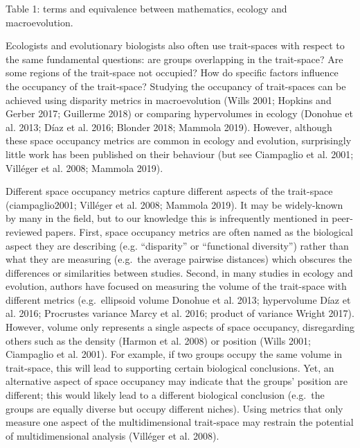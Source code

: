 \documentclass[]{article}
\begin{document}
Table 1: terms and equivalence between mathematics, ecology and
macroevolution.

\renewcommand\baselinestretch{2}\selectfont

Ecologists and evolutionary biologists also often use trait-spaces with
respect to the same fundamental questions: are groups overlapping in the
trait-space? Are some regions of the trait-space not occupied? How do
specific factors influence the occupancy of the trait-space? Studying
the occupancy of trait-spaces can be achieved using disparity metrics in
macroevolution (Wills 2001; Hopkins and Gerber 2017; Guillerme 2018) or
comparing hypervolumes in ecology (Donohue et al. 2013; Díaz et al.
2016; Blonder 2018; Mammola 2019). However, although these space
occupancy metrics are common in ecology and evolution, surprisingly
little work has been published on their behaviour (but see Ciampaglio et
al. 2001; Villéger et al. 2008; Mammola 2019).

Different space occupancy metrics capture different aspects of the
trait-space (ciampaglio2001; Villéger et al. 2008; Mammola 2019). It may
be widely-known by many in the field, but to our knowledge this is
infrequently mentioned in peer-reviewed papers. First, space occupancy
metrics are often named as the biological aspect they are describing
(e.g. ``disparity'' or ``functional diversity'') rather than what they
are measuring (e.g.~the average pairwise distances) which obscures the
differences or similarities between studies. Second, in many studies in
ecology and evolution, authors have focused on measuring the volume of
the trait-space with different metrics (e.g.~ellipsoid volume Donohue et
al. 2013; hypervolume Díaz et al. 2016; Procrustes variance Marcy et al.
2016; product of variance Wright 2017). However, volume only represents
a single aspects of space occupancy, disregarding others such as the
density (Harmon et al. 2008) or position (Wills 2001; Ciampaglio et al.
2001). For example, if two groups occupy the same volume in trait-space,
this will lead to supporting certain biological conclusions. Yet, an
alternative aspect of space occupancy may indicate that the groups'
position are different; this would likely lead to a different biological
conclusion (e.g.~the groups are equally diverse but occupy different
niches). Using metrics that only measure one aspect of the
multidimensional trait-space may restrain the potential of
multidimensional analysis (Villéger et al. 2008).
\end{document}
